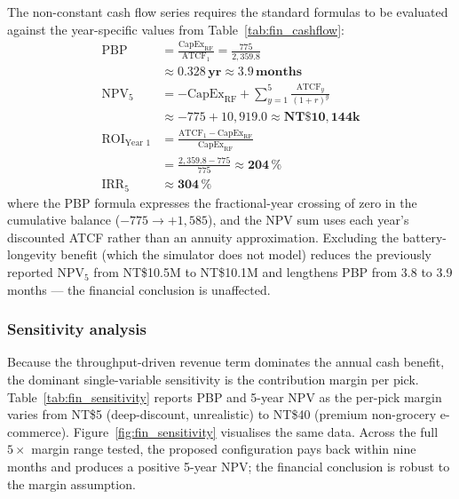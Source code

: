 \documentclass[conference]{IEEEtran}
\begin{document}
The non-constant cash flow series requires the standard formulas to be evaluated against the year-specific values from Table~\ref{tab:fin_cashflow}:
\begin{align}
\text{PBP} &= \frac{\text{CapEx}_\text{RF}}{\text{ATCF}_1} = \frac{775}{2{,}359.8} \nonumber \\
&\approx \mathbf{0.328\,\text{yr} \approx 3.9\,\text{months}} \\
\text{NPV}_5 &= -\text{CapEx}_\text{RF} + \sum_{y=1}^{5} \frac{\text{ATCF}_y}{(1 + r)^y} \nonumber \\
&\approx -775 + 10{,}919.0 \approx \mathbf{NT\$10{,}144\text{k}} \\
\text{ROI}_\text{Year~1} &= \frac{\text{ATCF}_1 - \text{CapEx}_\text{RF}}{\text{CapEx}_\text{RF}} \nonumber \\
&= \frac{2{,}359.8 - 775}{775} \approx \mathbf{204\,\%} \\
\text{IRR}_5 &\approx \mathbf{304\,\%}
\end{align}
where the PBP formula expresses the fractional-year crossing of zero in the cumulative balance ($-775 \to +1{,}585$), and the NPV sum uses each year's discounted ATCF rather than an annuity approximation. Excluding the battery-longevity benefit (which the simulator does not model) reduces the previously reported NPV$_5$ from NT\$10.5M to NT\$10.1M and lengthens PBP from 3.8 to 3.9 months --- the financial conclusion is unaffected.

\subsubsection{Sensitivity analysis}

Because the throughput-driven revenue term dominates the annual cash benefit, the dominant single-variable sensitivity is the contribution margin per pick. Table~\ref{tab:fin_sensitivity} reports PBP and 5-year NPV as the per-pick margin varies from NT\$5 (deep-discount, unrealistic) to NT\$40 (premium non-grocery e-commerce). Figure~\ref{fig:fin_sensitivity} visualises the same data. Across the full $5\times$ margin range tested, the proposed configuration pays back within nine months and produces a positive 5-year NPV; the financial conclusion is robust to the margin assumption.
\end{document}

